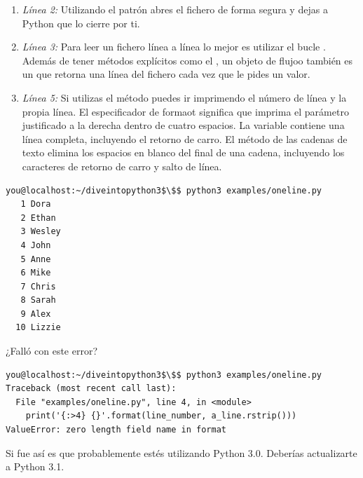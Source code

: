 \begin{enumerate}

\item \emph{Línea 2:} Utilizando el patrón  abres el fichero de forma segura y dejas a Python que lo cierre por ti.

\item \emph{Línea 3:} Para leer un fichero línea a línea lo mejor es utilizar el bucle . Además de tener métodos explícitos como el , un objeto de flujoo también es un  que retorna una línea del fichero cada vez que le pides un valor.

\item \emph{Línea 5:} Si utilizas el método  puedes ir imprimendo el número de línea y la propia línea. El especificador de formaot  significa que imprima el parámetro justificado a la derecha dentro de cuatro espacios. La variable  contiene una línea completa, incluyendo el retorno de carro. El método  de las cadenas de texto elimina los espacios en blanco del final de una cadena, incluyendo los caracteres de retorno de carro y salto de línea. 

\end{enumerate}

\noindent\begin{minipage}{\textwidth}
\begin{lstlisting}[mathescape=True]
you@localhost:~/diveintopython3$\$$ python3 examples/oneline.py
   1 Dora
   2 Ethan
   3 Wesley
   4 John
   5 Anne
   6 Mike
   7 Chris
   8 Sarah
   9 Alex
  10 Lizzie
\end{lstlisting}
\end{minipage}

¿Falló con este error?

\noindent\begin{minipage}{\textwidth}
\begin{lstlisting}[mathescape=True]
you@localhost:~/diveintopython3$\$$ python3 examples/oneline.py
Traceback (most recent call last):
  File "examples/oneline.py", line 4, in <module>
    print('{:>4} {}'.format(line_number, a_line.rstrip()))
ValueError: zero length field name in format
\end{lstlisting}
\end{minipage}

Si fue así es que probablemente estés utilizando Python 3.0. Deberías actualizarte a Python 3.1.


